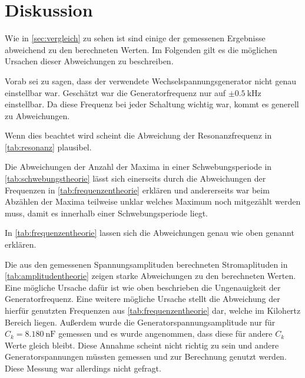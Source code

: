 \section{Diskussion}
\label{sec:Diskussion}


Wie in \autoref{sec:vergleich} zu sehen ist sind einige der gemessenen Ergebnisse abweichend zu den berechneten Werten. Im Folgenden gilt es die möglichen Ursachen dieser Abweichungen zu beschreiben.

Vorab sei zu sagen, dass der verwendete Wechselspannungsgenerator nicht genau einstellbar war. Geschätzt war die Generatorfrequenz nur auf $\pm \SI{0.5}{\kilo\hertz}$ einstellbar. 
Da diese Frequenz bei jeder Schaltung wichtig war, kommt es generell zu Abweichungen.

Wenn dies beachtet wird scheint die Abweichung der Resonanzfrequenz in \autoref{tab:resonanz} plausibel.

Die Abweichungen der Anzahl der Maxima in einer Schwebungsperiode in \autoref{tab:schwebungstheorie} lässt sich einerseits durch die Abweichungen der Frequenzen in \autoref{tab:frequenzentheorie} erklären und andererseits war beim Abzählen der Maxima teilweise unklar welches Maximum noch mitgezählt werden muss, damit es innerhalb einer Schwebungsperiode liegt.

In \autoref{tab:frequenzentheorie} lassen sich die Abweichungen genau wie oben genannt erklären.

Die aus den gemessenen Spannungsamplituden berechneten Stromaplituden in \autoref{tab:amplitudentheorie} zeigen starke Abweichungen zu den berechneten Werten.
Eine mögliche Ursache dafür ist wie oben beschrieben die Ungenauigkeit der Generatorfrequenz.
Eine weitere mögliche Ursache stellt die Abweichung der hierfür genutzten Frequenzen aus \autoref{tab:frequenzentheorie} dar, welche im Kilohertz Bereich liegen.
Außerdem wurde die Generatorspannungsamplitude nur für $C_k = \SI{8.180}{\nano\farad}$ gemessen und es wurde angenommen, dass diese für andere $C_k$ Werte gleich bleibt. 
Diese Annahme scheint nicht richtig zu sein und andere Generatorspannungen müssten gemessen und zur Berechnung genutzt werden. Diese Messung war allerdings nicht gefragt.
